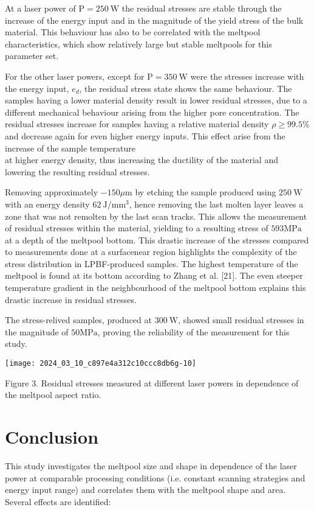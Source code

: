 \documentclass[10pt]{article}
\begin{document}
At a laser power of $\mathrm{P}=250 \mathrm{~W}$ the residual stresses are stable through the increase of the energy input and in the magnitude of the yield stress of the bulk material. This behaviour has also to be correlated with the meltpool characteristics, which show relatively large but stable meltpools for this parameter set.

For the other laser powers, except for $\mathrm{P}=350 \mathrm{~W}$ were the stresses increase with the energy input, $e_{d}$, the residual stress state shows the same behaviour. The samples having a lower material density result in lower residual stresses, due to a different mechanical behaviour arising from the higher pore concentration. The residual stresses increase for samples having a relative material density $\rho \geq 99.5 \%$ and decrease again for even higher energy inputs. This effect arise from the increase of the sample temperature\\
at higher energy density, thus increasing the ductility of the material and lowering the resulting residual stresses.

Removing approximately $-150 \mu \mathrm{m}$ by etching the sample produced using $250 \mathrm{~W}$ with an energy density $62 \mathrm{~J} / \mathrm{mm}^{3}$, hence removing the last molten layer leaves a zone that was not remolten by the last scan tracks. This allows the measurement of residual stresses within the material, yielding to a resulting stress of $593 \mathrm{MPa}$ at a depth of the meltpool bottom. This drastic increase of the stresses compared to measurements done at a surfacenear region highlights the complexity of the stress distribution in LPBF-produced samples. The highest temperature of the meltpool is found at its bottom according to Zhang et al. [21]. The even steeper temperature gradient in the neighbourhood of the meltpool bottom explains this drastic increase in residual stresses.

The stress-relived samples, produced at $300 \mathrm{~W}$, showed small residual stresses in the magnitude of $50 \mathrm{MPa}$, proving the reliability of the measurement for this study.

\begin{center}
\texttt{[image: 2024\_03\_10\_c897e4a312c10ccc8db6g-10]}
\end{center}

Figure 3. Residual stresses measured at different laser powers in dependence of the meltpool aspect ratio.

\section*{Conclusion}
This study investigates the meltpool size and shape in dependence of the laser power at comparable processing conditions (i.e. constant scanning strategies and energy input range) and correlates them with the meltpool shape and area. Several effects are identified:
\end{document}
